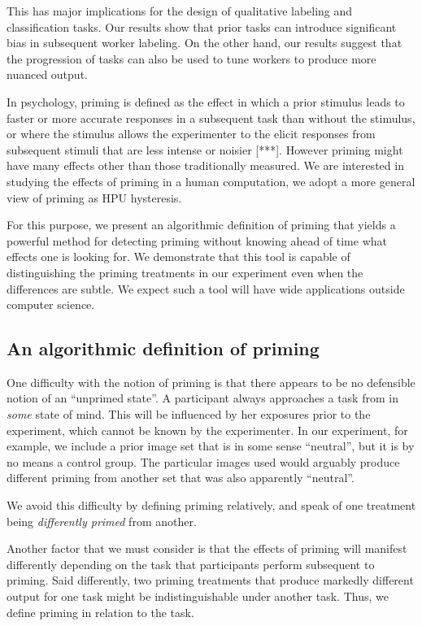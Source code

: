 \documentclass[a4paper]{report}
\begin{document}
This has major implications for the design of qualitative labeling and 
classification tasks.  Our results show that prior tasks can introduce 
significant bias in subsequent worker labeling.  On the other hand, our 
results suggest that the progression of tasks can also be used to tune 
workers to produce more nuanced output.

In psychology, priming is defined as the effect in which a prior stimulus leads
to faster or more accurate responses in a subsequent task than without the
stimulus, or where the stimulus allows the experimenter to the elicit 
responses from subsequent stimuli that are less intense or noisier [***].
However priming might have many effects other than those traditionally 
measured.  We are interested in studying the effects of priming in a human 
computation, we adopt a more general view of priming as HPU hysteresis.

For this purpose, we present an algorithmic definition of priming that
yields a powerful method for detecting priming without knowing ahead of time 
what effects one is looking for.  We demonstrate that this tool is capable of 
distinguishing the priming treatments in our experiment even when the 
differences are subtle.  We expect such a tool will have wide applications 
outside computer science.

\subsection*{An algorithmic definition of priming}

One difficulty with the notion of priming is that there appears to be no 
defensible notion of an ``unprimed state''.  A participant always approaches
a task from in \textit{some} state of mind.  This will be influenced by her
exposures prior to the experiment, which cannot be known by the experimenter.  
In our experiment, for example, we include a prior image set that is in some
sense ``neutral'', but it is by no means a control group. The particular 
images used would arguably produce different priming from another set that
was also apparently ``neutral''.

We avoid this difficulty by defining priming relatively, and speak of one
treatment being \textit{differently primed} from another.

Another factor that we must consider is that the effects of priming will
manifest differently depending on the task that participants perform 
subsequent to priming.  Said differently, two priming treatments that
produce markedly different output for one task might be 
indistinguishable under another task.  Thus, we define priming
in relation to the task.
\end{document}
